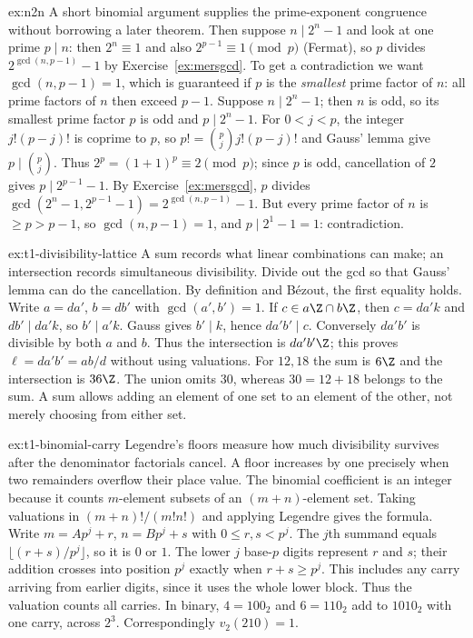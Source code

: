 \begin{solution}{ex:n2n}
\idea A short binomial argument supplies the prime-exponent congruence without borrowing a later theorem. Then suppose $n\mid2^n-1$ and look at one prime $p\mid n$: then $2^n\equiv1$ and also $2^{p-1}\equiv1\pmod p$ (Fermat), so $p$ divides $2^{\gcd(n,p-1)}-1$ by Exercise~\ref{ex:mersgcd}. To get a contradiction we want $\gcd(n,p-1)=1$, which is guaranteed if $p$ is the \emph{smallest} prime factor of $n$: all prime factors of $n$ then exceed $p-1$.
\writeup Suppose $n\mid2^n-1$; then $n$ is odd, so its smallest prime factor $p$ is odd and $p\mid2^n-1$. For $0<j<p$, the integer $j!(p-j)!$ is coprime to $p$, so
$p!=\binom pj j!(p-j)!$ and Gauss' lemma give $p\mid\binom pj$.
Thus $2^p=(1+1)^p\equiv2\pmod p$; since $p$ is odd, cancellation
of $2$ gives $p\mid2^{p-1}-1$. By Exercise~\ref{ex:mersgcd}, $p$ divides $\gcd(2^n-1,2^{p-1}-1)=2^{\gcd(n,p-1)}-1$. But every prime factor of $n$ is $\ge p>p-1$, so $\gcd(n,p-1)=1$, and $p\mid2^1-1=1$: contradiction.
\end{solution}

\begin{solution}{ex:t1-divisibility-lattice}
\idea A sum records what linear combinations can make; an intersection records simultaneous divisibility. Divide out the gcd so that Gauss' lemma can do the cancellation.
\writeup By definition and B\'ezout, the first equality holds. Write $a=da'$, $b=db'$ with $\gcd(a',b')=1$. If $c\in a\Z\cap b\Z$, then $c=da'k$ and $db'\mid da'k$, so $b'\mid a'k$. Gauss gives $b'\mid k$, hence $da'b'\mid c$. Conversely $da'b'$ is divisible by both $a$ and $b$. Thus the intersection is $da'b'\Z$; this proves $\ell=da'b'=ab/d$ without using valuations. For $12,18$ the sum is $6\Z$ and the intersection is $36\Z$. The union omits $30$, whereas $30=12+18$ belongs to the sum. A sum allows adding an element of one set to an element of the other, not merely choosing from either set.
\end{solution}

\begin{solution}{ex:t1-binomial-carry}
\idea Legendre's floors measure how much divisibility survives after the denominator factorials cancel. A floor increases by one precisely when two remainders overflow their place value.
\writeup The binomial coefficient is an integer because it counts $m$-element subsets of an $(m+n)$-element set. Taking valuations in $(m+n)!/(m!n!)$ and applying Legendre gives the formula. Write $m=Ap^j+r$, $n=Bp^j+s$ with $0\le r,s<p^j$. The $j$th summand equals $\lfloor(r+s)/p^j\rfloor$, so it is $0$ or $1$. The lower $j$ base-$p$ digits represent $r$ and $s$; their addition crosses into position $p^j$ exactly when $r+s\ge p^j$. This includes any carry arriving from earlier digits, since it uses the whole lower block. Thus the valuation counts all carries. In binary, $4=100_2$ and $6=110_2$ add to $1010_2$ with one carry, across $2^3$. Correspondingly $v_2(210)=1$.
\end{solution}

